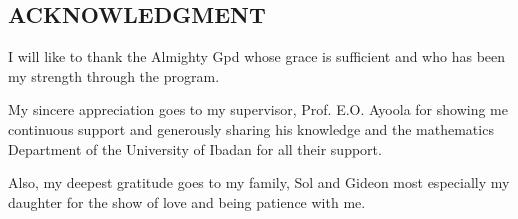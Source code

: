 \documentclass[a4 paper, 12pt]{report}
\theoremstyle{plain}
\begin{document}
\newpage
\begin{center}
	\section*{ACKNOWLEDGMENT}
\end{center}
\par I will like to thank the Almighty Gpd whose grace is sufficient and who has been my strength through the program.\\
\par My sincere appreciation goes to my supervisor, Prof. E.O. Ayoola for showing me continuous support and generously sharing his knowledge and the mathematics Department of the University of Ibadan for all their support.\\
\par Also, my deepest gratitude goes to my family, Sol and Gideon  most especially my daughter for the show of love and being patience with me.%
\end{document}

